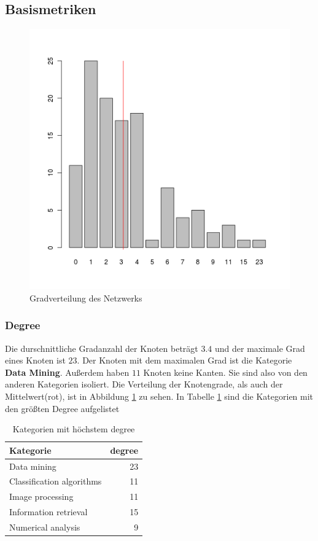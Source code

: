 \documentclass{acm_proc_article-sp}
\begin{document}
\subsection{Basismetriken}
\begin{figure}[H]
\centering
\includegraphics[scale=0.35]{../visualization/degree_hist.png}
\caption{Gradverteilung des Netzwerks}
\label{fig:degree}
\end{figure}
\subsubsection{Degree}
Die durschnittliche Gradanzahl der Knoten beträgt $3.4$ und der maximale Grad eines Knoten ist $23$. Der Knoten mit dem maximalen Grad ist die Kategorie \textbf{Data Mining}. Außerdem haben $11$ Knoten keine Kanten. Sie sind also von den anderen Kategorien isoliert. Die Verteilung der Knotengrade, als auch der Mittelwert(rot), ist in Abbildung \ref{fig:degree} zu sehen. In Tabelle \ref{tab:degree} sind die Kategorien mit den größten Degree aufgelistet
\begin{table}[H]
\centering
\begin{tabular}{lr}
\hline
Kategorie & degree \\ 
\hline
Data mining & 23 \\ 
Classification algorithms & 11 \\ 
Image processing & 11 \\ 
Information retrieval & 15 \\ 
Numerical analysis & 9 \\ 
\hline
\end{tabular}
\caption{Kategorien mit höchstem degree}
\label{tab:degree}
\end{table}
\end{document}
